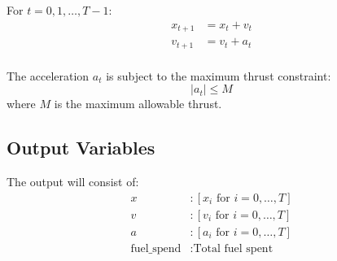 \documentclass{article}
\begin{document}
For \( t = 0, 1, \ldots, T-1 \):
\begin{align}
x_{t+1} & = x_t + v_t \\
v_{t+1} & = v_t + a_t \\
\end{align}

The acceleration \( a_t \) is subject to the maximum thrust constraint:
\[
|a_t| \leq M
\]
where \( M \) is the maximum allowable thrust.

\subsection*{Output Variables}
The output will consist of:
\begin{align*}
x & : [x_i \text{ for } i = 0, \ldots, T] \\
v & : [v_i \text{ for } i = 0, \ldots, T] \\
a & : [a_i \text{ for } i = 0, \ldots, T] \\
\text{fuel\_spend} & : \text{Total fuel spent}
\end{align*}
\end{document}
